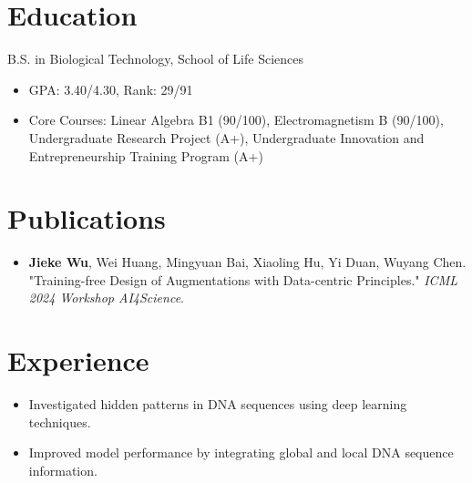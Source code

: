 \documentclass{resume}
\begin{document}



\section{Education}

B.S. in Biological Technology, School of Life Sciences
\begin{itemize}
  \item GPA: 3.40/4.30, Rank: 29/91
  \item Core Courses: Linear Algebra B1 (90/100), Electromagnetism B (90/100), Undergraduate Research Project (A+), Undergraduate Innovation and Entrepreneurship Training Program (A+)
\end{itemize}

\section{Publications}
\begin{itemize}
  \item \textbf{Jieke Wu}, Wei Huang, Mingyuan Bai, Xiaoling Hu, Yi Duan, Wuyang Chen. "Training-free Design of Augmentations with Data-centric Principles." \emph{ICML 2024 Workshop AI4Science}.
\end{itemize}

\section{Experience}

\begin{itemize}
  \item Investigated hidden patterns in DNA sequences using deep learning techniques.
  \item Improved model performance by integrating global and local DNA sequence information.
\end{itemize}
\end{document}
